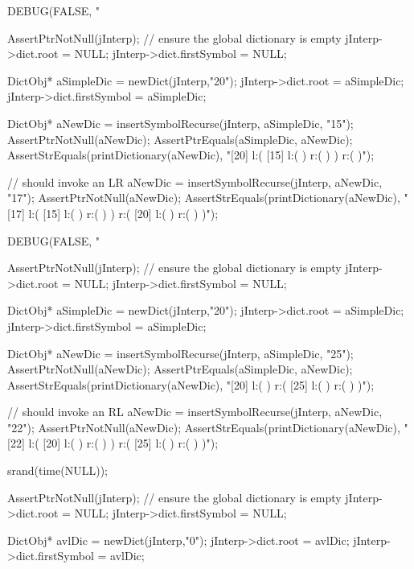 \startCTest
  DEBUG(FALSE, "\n%

  AssertPtrNotNull(jInterp);
  // ensure the global dictionary is empty
  jInterp->dict.root        = NULL;
  jInterp->dict.firstSymbol = NULL;

  DictObj* aSimpleDic = newDict(jInterp,"20");
  jInterp->dict.root        = aSimpleDic;
  jInterp->dict.firstSymbol = aSimpleDic;

  DictObj* aNewDic = insertSymbolRecurse(jInterp, aSimpleDic, "15");
  AssertPtrNotNull(aNewDic);
  AssertPtrEquals(aSimpleDic, aNewDic);
  AssertStrEquals(printDictionary(aNewDic),
  "[20] l:( [15] l:(  ) r:(  )  ) r:(  )");

  // should invoke an LR
  aNewDic = insertSymbolRecurse(jInterp, aNewDic, "17");
  AssertPtrNotNull(aNewDic);
  AssertStrEquals(printDictionary(aNewDic),
  "[17] l:( [15] l:(  ) r:(  )  ) r:( [20] l:(  ) r:(  )  )");
\stopCTest
\stopTestCase


\startCTest
  DEBUG(FALSE, "\n%

  AssertPtrNotNull(jInterp);
  // ensure the global dictionary is empty
  jInterp->dict.root        = NULL;
  jInterp->dict.firstSymbol = NULL;

  DictObj* aSimpleDic = newDict(jInterp,"20");
  jInterp->dict.root        = aSimpleDic;
  jInterp->dict.firstSymbol = aSimpleDic;

  DictObj* aNewDic = insertSymbolRecurse(jInterp, aSimpleDic, "25");
  AssertPtrNotNull(aNewDic);
  AssertPtrEquals(aSimpleDic, aNewDic);
  AssertStrEquals(printDictionary(aNewDic),
  "[20] l:(  ) r:( [25] l:(  ) r:(  )  )");

  // should invoke an RL
  aNewDic = insertSymbolRecurse(jInterp, aNewDic, "22");
  AssertPtrNotNull(aNewDic);
  AssertStrEquals(printDictionary(aNewDic),
  "[22] l:( [20] l:(  ) r:(  )  ) r:( [25] l:(  ) r:(  )  )");
\stopCTest
\stopTestCase

\startCTest

  srand(time(NULL));

  AssertPtrNotNull(jInterp);
  // ensure the global dictionary is empty
  jInterp->dict.root        = NULL;
  jInterp->dict.firstSymbol = NULL;

  DictObj* avlDic = newDict(jInterp,"0");
  jInterp->dict.root        = avlDic;
  jInterp->dict.firstSymbol = avlDic;

